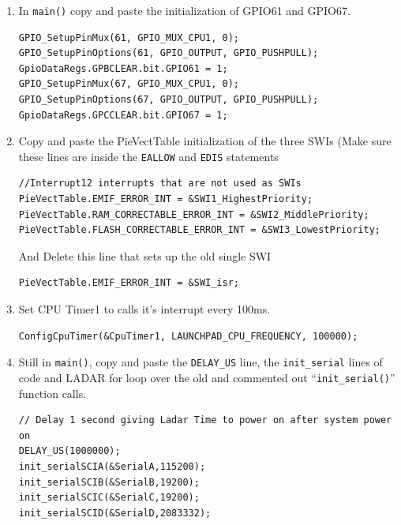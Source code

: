 \documentclass[11pt]{article}
\begin{document}
\begin{enumerate}
\begin{verbatim}
extern uint16_t LADARpingpong;
extern float LADARxoffset;
extern float LADARyoffset;

extern uint16_t newLinuxCommands;
extern float LinuxCommands[CMDNUM_FROM_FLOATS];

extern uint16_t NewLVData;

uint16_t LADARi = 0;
pose ROBOTps = {0,0,0}; //robot position
// 3.5/12 for front mounting, theta is not used in this current code
pose LADARps = {3.5/12.0,0,1};
float printLinux1 = 0;
float printLinux2 = 0;
\end{verbatim}
        \item In \texttt{main()} copy and paste the initialization of GPIO61 and GPIO67.
\begin{verbatim}
GPIO_SetupPinMux(61, GPIO_MUX_CPU1, 0);
GPIO_SetupPinOptions(61, GPIO_OUTPUT, GPIO_PUSHPULL);
GpioDataRegs.GPBCLEAR.bit.GPIO61 = 1;
GPIO_SetupPinMux(67, GPIO_MUX_CPU1, 0);
GPIO_SetupPinOptions(67, GPIO_OUTPUT, GPIO_PUSHPULL);
GpioDataRegs.GPCCLEAR.bit.GPIO67 = 1;
\end{verbatim}
        \item Copy and paste the PieVectTable initialization of the three SWIs (Make sure these lines are inside the \texttt{EALLOW} and \texttt{EDIS} statements
\begin{verbatim}
//Interrupt12 interrupts that are not used as SWIs
PieVectTable.EMIF_ERROR_INT = &SWI1_HighestPriority;
PieVectTable.RAM_CORRECTABLE_ERROR_INT = &SWI2_MiddlePriority;
PieVectTable.FLASH_CORRECTABLE_ERROR_INT = &SWI3_LowestPriority;
\end{verbatim}
            And Delete this line that sets up the old single SWI
\begin{verbatim}
PieVectTable.EMIF_ERROR_INT = &SWI_isr;
\end{verbatim}
        \item Set CPU Timer1 to calls it’s interrupt every 100ms.
\begin{verbatim}
ConfigCpuTimer(&CpuTimer1, LAUNCHPAD_CPU_FREQUENCY, 100000);
\end{verbatim}
            \item Still in \texttt{main()}, copy and paste the \texttt{DELAY_US} line, the \texttt{init_serial} lines of code and LADAR for loop over the old and commented out “\texttt{init_serial()}” function calls.
\begin{verbatim}
// Delay 1 second giving Ladar Time to power on after system power on
DELAY_US(1000000);
init_serialSCIA(&SerialA,115200);
init_serialSCIB(&SerialB,19200);
init_serialSCIC(&SerialC,19200);
init_serialSCID(&SerialD,2083332);


\end{verbatim}
\end{enumerate}
\end{document}
